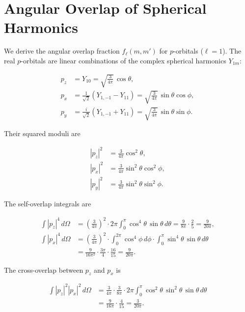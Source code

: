 \documentclass[11pt,a4paper]{article}
\begin{document}

\appendix
\section{Angular Overlap of Spherical Harmonics}
\label{app:angular}

We derive the angular overlap fraction $f_\ell(m,m')$ for $p$-orbitals ($\ell = 1$). The real $p$-orbitals are linear combinations of the complex spherical harmonics $Y_{1m}$:

\begin{align}
p_z &= Y_{10} = \sqrt{\frac{3}{4\pi}}\,\cos\theta, \\
p_x &= \frac{1}{\sqrt{2}}(Y_{1,-1} - Y_{11}) = \sqrt{\frac{3}{4\pi}}\,\sin\theta\cos\phi, \\
p_y &= \frac{i}{\sqrt{2}}(Y_{1,-1} + Y_{11}) = \sqrt{\frac{3}{4\pi}}\,\sin\theta\sin\phi.
\end{align}

Their squared moduli are

\begin{align}
|p_z|^2 &= \frac{3}{4\pi}\cos^2\theta, \\
|p_x|^2 &= \frac{3}{4\pi}\sin^2\theta\cos^2\phi, \\
|p_y|^2 &= \frac{3}{4\pi}\sin^2\theta\sin^2\phi.
\end{align}

The self-overlap integrals are

\begin{align}
\int |p_z|^4 \, d\Omega &= \left(\frac{3}{4\pi}\right)^2 \cdot 2\pi\int_0^\pi \cos^4\theta\,\sin\theta\,d\theta 
= \frac{9}{8\pi}\cdot\frac{2}{5} = \frac{9}{20\pi}, \\
\int |p_x|^4 \, d\Omega &= \left(\frac{3}{4\pi}\right)^2 \cdot \int_0^{2\pi}\cos^4\phi\,d\phi \cdot \int_0^\pi \sin^4\theta\,\sin\theta\,d\theta \nonumber\\
&= \frac{9}{16\pi^2}\cdot\frac{3\pi}{4}\cdot\frac{16}{15} = \frac{9}{20\pi}.
\end{align}

The cross-overlap between $p_z$ and $p_x$ is

\begin{align}
\int |p_z|^2|p_x|^2 \, d\Omega &= \frac{3}{4\pi}\cdot\frac{3}{8\pi}\cdot 2\pi\int_0^\pi \cos^2\theta\,\sin^2\theta\,\sin\theta\,d\theta \nonumber\\
&= \frac{9}{16\pi}\cdot\frac{4}{15} = \frac{3}{20\pi}.
\end{align}
\end{document}
